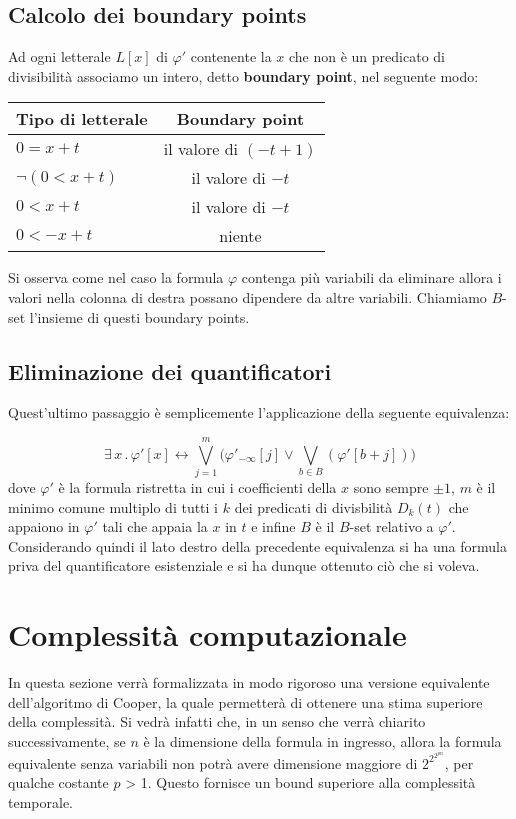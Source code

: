 \documentclass[11pt,letterpaper,twoside]{article}
\begin{document}
\subsection{Calcolo dei boundary points} Ad ogni letterale $L[x]$ di $\varphi '$
contenente la $x$ che non è un predicato di divisibilit\`a associamo un intero,
detto \textbf{boundary point}, nel seguente modo:

\begin{center}
  \begin{tabular}{ l | c }
    Tipo di letterale & Boundary point \\ \hline
    $0=x+t$ & il valore di $(-t + 1)$ \\
    $\lnot (0 < x+t)$ & il valore di $-t$ \\
    $0 < x + t$ & il valore di $-t$ \\
    $0 < -x + t$ &  niente
  \end{tabular}
\end{center}

Si osserva come nel caso la formula $\varphi$ contenga più variabili da
eliminare allora i valori nella colonna di destra possano dipendere da altre
variabili.  Chiamiamo $B$-set l'insieme di questi boundary points.

\subsection{Eliminazione dei quantificatori} Quest'ultimo passaggio è
semplicemente l'applicazione della seguente equivalenza\autocite{cooper}:

$$ \exists \, x \, . \, \varphi'[x] \longleftrightarrow \bigvee_{j=1}^m \Big(
\varphi'_{- \infty}[j] \lor \bigvee_{b \in B}(\varphi'[b+j]) \Big)$$ dove
$\varphi'$ è la formula ristretta in cui i coefficienti della $x$ sono sempre
$\pm 1$, $m$ è il minimo comune multiplo di tutti i $k$ dei predicati di
divisbilit\`a $D_k(t)$ che appaiono in $\varphi'$ tali che appaia la $x$ in $t$
e infine $B$ \`e il $B$-set relativo a $\varphi'$.  Considerando quindi il lato
destro della precedente equivalenza si ha una formula priva del quantificatore
esistenziale e si ha dunque ottenuto ciò che si voleva.

\newpage

\section{Complessità computazionale}
In questa sezione verrà formalizzata in modo rigoroso una versione equivalente
dell'algoritmo di Cooper, la quale permetterà di ottenere una stima superiore
della complessità.
Si vedrà infatti che, in un senso che verrà chiarito successivamente, se $n$ è
la dimensione della formula in ingresso, allora la formula equivalente senza
variabili non potrà avere dimensione maggiore di $2^{2^{2^{pn}}}$, per qualche
costante $p$ > 1. Questo fornisce un bound superiore alla complessità temporale.
\end{document}
